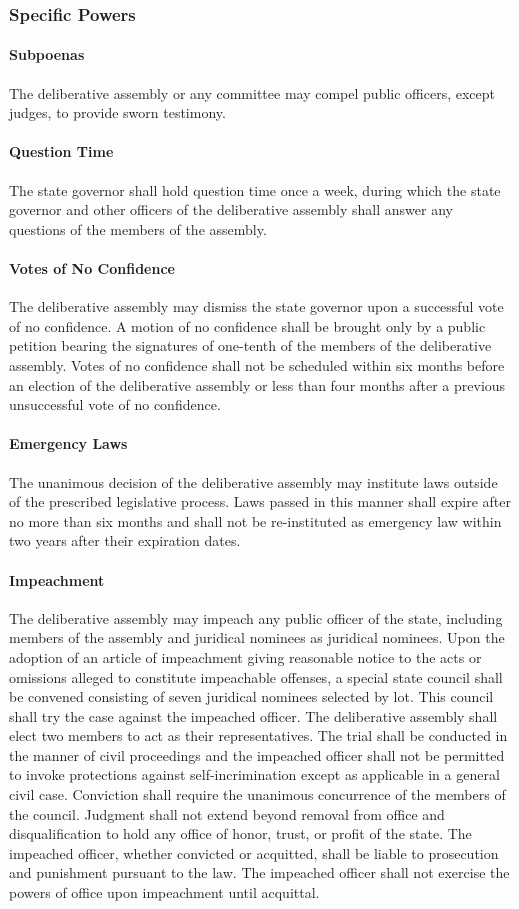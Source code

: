 \documentclass{article}
\begin{document}
\subsubsection{Specific Powers}
\paragraph{Subpoenas}
The deliberative assembly or any committee may compel public officers, except judges, to provide sworn testimony.
\paragraph{Question Time}
The state governor shall hold question time once a week, during which the state governor and other officers of the deliberative assembly shall answer any questions of the members of the assembly.
\paragraph{Votes of No Confidence}
The deliberative assembly may dismiss the state governor upon a successful vote of no confidence. A motion of no confidence shall be brought only by a public petition bearing the signatures of one-tenth of the members of the deliberative assembly. Votes of no confidence shall not be scheduled within six months before an election of the deliberative assembly or less than four months after a previous unsuccessful vote of no confidence.
\paragraph{Emergency Laws}
The unanimous decision of the deliberative assembly may institute laws outside of the prescribed legislative process. Laws passed in this manner shall expire after no more than six months and shall not be re-instituted as emergency law within two years after their expiration dates.
\paragraph{Impeachment}
The deliberative assembly may impeach any public officer of the state, including members of the assembly and juridical nominees as juridical nominees. Upon the adoption of an article of impeachment giving reasonable notice to the acts or omissions alleged to constitute impeachable offenses, a special state council shall be convened consisting of seven juridical nominees selected by lot. This council shall try the case against the impeached officer. The deliberative assembly shall elect two members to act as their representatives. The trial shall be conducted in the manner of civil proceedings and the impeached officer shall not be permitted to invoke protections against self-incrimination except as applicable in a general civil case. Conviction shall require the unanimous concurrence of the members of the council. Judgment shall not extend beyond removal from office and disqualification to hold any office of honor, trust, or profit of the state. The impeached officer, whether convicted or acquitted, shall be liable to prosecution and punishment pursuant to the law. The impeached officer shall not exercise the powers of office upon impeachment until acquittal.
\end{document}
